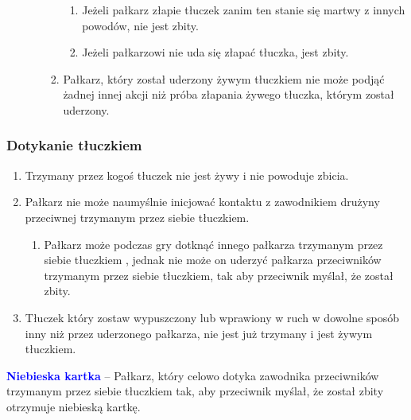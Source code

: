 \documentclass[12pt]{article}
\newcommand\bluecard[1]{\bgroup\textcolor{blue}{\textbf{#1}}}
\begin{document}
\begin{enumerate}
\begin{enumerate}
\begin{enumerate}
			                  \begin{enumerate}
				                  \item
				                        Jeżeli pałkarz złapie tłuczek zanim ten stanie się martwy z
				                        innych powodów, nie jest zbity.
				                  \item
				                        Jeżeli pałkarzowi nie uda się złapać tłuczka, jest zbity.
			                  \end{enumerate}
			            \item
			                  Pałkarz, który został uderzony żywym tłuczkiem nie może podjąć
			                  żadnej innej akcji niż próba złapania żywego tłuczka, którym
			                  został uderzony.
		            \end{enumerate}
	      \end{enumerate}
\end{enumerate}

\subsubsection{Dotykanie tłuczkiem}

\begin{enumerate}
	\item
	      Trzymany przez kogoś tłuczek nie jest żywy i nie powoduje zbicia.
	\item
	      Pałkarz nie może naumyślnie inicjować kontaktu z zawodnikiem drużyny
	      przeciwnej trzymanym przez siebie tłuczkiem.

	      \begin{enumerate}
		      \item
		            Pałkarz może podczas gry dotknąć innego pałkarza trzymanym przez
		            siebie tłuczkiem , jednak nie może on uderzyć pałkarza przeciwników
		            trzymanym przez siebie tłuczkiem, tak aby przeciwnik myślał, że
		            został zbity.
	      \end{enumerate}
	\item
	      Tłuczek który zostaw wypuszczony lub wprawiony w ruch w dowolne sposób
	      inny niż przez uderzonego pałkarza, nie jest już trzymany i jest żywym
	      tłuczkiem.
\end{enumerate}

\bluecard{Niebieska kartka} -- Pałkarz, który celowo dotyka zawodnika
przeciwników trzymanym przez siebie tłuczkiem tak, aby przeciwnik
myślał, że został zbity otrzymuje niebieską kartkę.
\end{document}
